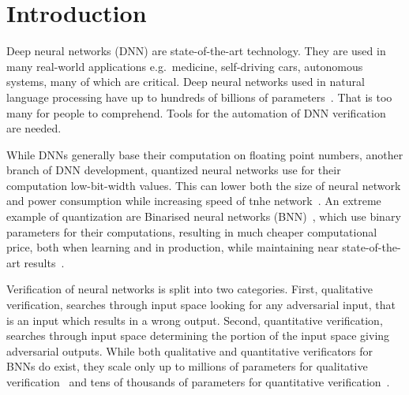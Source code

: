 \chapter*{Introduction}

Deep neural networks (DNN) are state-of-the-art technology. They are used in many
real-world applications e.g.\ medicine, self-driving cars, autonomous systems,
many of which are critical.
Deep neural networks used in natural language processing have up to hundreds of
billions of parameters~\cite{2021arXiv210901652W}.
That is too many for people to comprehend. Tools for the automation
of DNN verification are needed.


While DNNs generally base their computation on floating point numbers,
another branch of DNN development, quantized neural networks
use for their computation low-bit-width values.
This can lower both the size of neural network and power consumption
while increasing speed of tnhe network~\cite{jacob2017,han2016}.
An extreme example of quantization are Binarised neural networks (BNN)~\cite{nips2016},
which use binary parameters for their computations, resulting in much
cheaper computational price, both when learning and in production,
while maintaining near state-of-the-art results~\cite{Agrawal2023}.

Verification of neural networks is split into two categories. First,
qualitative verification, searches through input space looking for any
adversarial input, that is an input which results in a wrong output.
Second, quantitative verification, searches through input space
determining the portion of the input space giving adversarial outputs.
While both qualitative and quantitative verificators for BNNs do exist,
they scale only up to millions of parameters for qualitative verification~\cite{10.1007/978-3-030-03592-1_16}
and tens of thousands of parameters for quantitative verification~\cite{10.1145/3563212}.
\vspace{1em}


